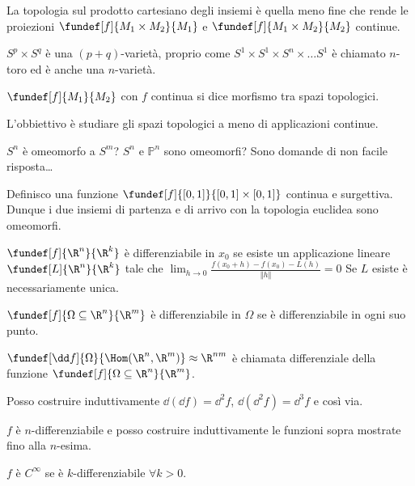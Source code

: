 \begin{oss}
La topologia sul prodotto cartesiano degli insiemi è quella meno fine che rende le proiezioni $\fundef[f]{M_1 \times M_2}{M_1}$ e $\fundef[f]{M_1 \times M_2}{M_2}$ continue.
\end{oss}
\begin{oss}
$S^p \times S^q$ è una $(p+q)$-varietà, proprio come $S^1 \times S^1 \times S^n \times \ldots S^1$ è chiamato $n$-toro ed è anche una $n$-varietà.
\end{oss}
\begin{defn}
$\fundef[f]{M_1}{M_2}$ con $f$ continua si dice morfismo tra spazi topologici.
\end{defn}
L'obbiettivo è studiare gli spazi topologici a meno di applicazioni continue.
\begin{oss} 
$S^n$ è omeomorfo a $S^m$? $S^n$ e $\mathbb{P}^n$ sono omeomorfi? 
Sono domande di non facile risposta\dots
\end{oss}
\begin{es}
Definisco una funzione $\fundef[f]{[0,1]}{[0,1]\times[0,1]}$ continua e surgettiva. Dunque i due insiemi di partenza e di arrivo con la topologia euclidea sono omeomorfi.
\end{es}
\begin{defn}
$\fundef[f]{\R^n}{\R^k}$ è differenziabile in $x_0$ se esiste un applicazione lineare $\fundef[L]{\R^n}{\R^k}$ tale che $\lim_{h\to 0}{\frac{f(x_0+h)-f(x_0)-L(h)}{\Vert h \Vert}}=0$
Se $L$ esiste è necessariamente unica.
\end{defn}
\begin{defn}
$\fundef[f]{\Omega \subseteq \R^n}{\R^m}$ è differenziabile in $\Omega$ se è differenziabile in ogni suo punto.
\end{defn}
\begin{defn}
$\fundef[\dd f]{\Omega}{\Hom(\R^n, \R^m)} \approx \R^{nm}$ è chiamata differenziale della funzione $\fundef[f]{\Omega \subseteq \R^n}{\R^m}$.
\end{defn}
\begin{oss}
Posso costruire induttivamente $\dd(\dd f) = \dd^2f$, $\dd(\dd^2f) = \dd^3f$ e così via.
\end{oss}
\begin{oss}
$f$ è $n$-differenziabile e posso costruire induttivamente le funzioni sopra mostrate fino alla $n$-esima.
\end{oss}
\begin{defn}
$f$ è $C^{\infty}$ se è $k$-differenziabile $\forall k > 0$.
\end{defn}
